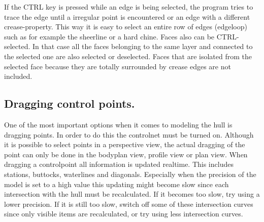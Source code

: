 \documentclass[12pt]{article}
\begin{document}
If the CTRL key is pressed while an edge is being selected, the
program tries to trace the edge until a irregular point is encountered
or an edge with a different crease-property. This way it is easy to
select an entire row of edges (edgeloop) such as for example the
sheerline or a hard chine.  Faces also can be CTRL-selected. In that
case all the faces belonging to the same layer and connected to the
selected one are also selected or deselected. Faces that are isolated
from the selected face because they are totally surrounded by crease
edges are not included.

\subsection{Dragging control points.}
One of the most important options when it comes to modeling the hull
is dragging points. In order to do this the controlnet must be turned
on. Although it is possible to select points in a perspective view,
the actual dragging of the point can only be done in the bodyplan
view, profile view or plan view. When dragging a controlpoint all
information is updated realtime. This includes stations, buttocks,
waterlines and diagonals. Especially when the precision of the model
is set to a high value this updating might become slow since each
intersection with the hull must be recalculated. If it becomes too
slow, try using a lower precision. If it is still too slow, switch off
some of these intersection curves since only visible items are
recalculated, or try using less intersection curves.
\end{document}
